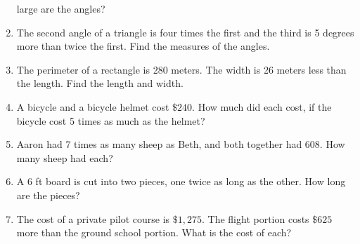 \documentclass[12pt]{article}
\theoremstyle{definition}
\begin{document}
\begin{enumerate}
large are the angles?
\item The second angle of a triangle is four times the first and the third is 5 degrees more than twice the first. Find the measures of the angles.
\item The perimeter of a rectangle is 280 meters. The width is 26 meters less than the length. Find the length and width.
\item A bicycle and a bicycle helmet cost $\$240$. How much did each cost, if the bicycle cost 5 times as much as the helmet?
\item Aaron had 7 times as many sheep as Beth, and both together had 608. How many sheep had each?
\item A 6 ft board is cut into two pieces, one twice as long as the other. How long are the pieces?
\item The cost of a private pilot course is $\$1,275$. The flight portion costs $\$625$ more than the ground school portion. What is the cost of each?
\end{enumerate}
\end{document}
